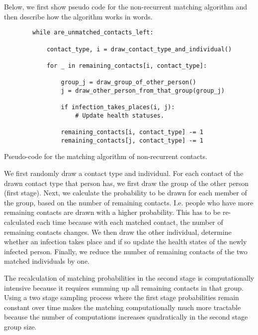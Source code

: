 Below, we first show pseudo code for the non-recurrent matching algorithm and then
describe how the algorithm works in words.

\begin{listing}
    \label{code:matching}
    \begin{verbatim}
        while are_unmatched_contacts_left:

            contact_type, i = draw_contact_type_and_individual()

            for _ in remaining_contacts[i, contact_type]:

                group_j = draw_group_of_other_person()
                j = draw_other_person_from_that_group(group_j)

                if infection_takes_places(i, j):
                    # Update health statuses.

                remaining_contacts[i, contact_type] -= 1
                remaining_contacts[j, contact_type] -= 1
    \end{verbatim}
    \caption{Pseudo-code for the matching algorithm of non-recurrent contacts.}
\end{listing}

We first randomly draw a contact type and individual. For each contact of the drawn
contact type that person has, we first draw the group of the other person (first stage).
Next, we calculate the probability to be drawn for each member of the group, based on
the number of remaining contacts. I.e. people who have more remaining contacts are drawn
with a higher probability. This has to be re-calculated each time because with each
matched contact, the number of remaining contacts changes. We then draw the other
individual, determine whether an infection takes place and if so update the health
states of the newly infected person. Finally, we reduce the number of remaining contacts
of the two matched individuals by one.

The recalculation of matching probabilities in the second stage is computationally
intensive because it requires summing up all remaining contacts in that group. Using a
two stage sampling process where the first stage probabilities remain constant over time
makes the matching computationally much more tractable because the number of
computations increases quadratically in the second stage group size.
